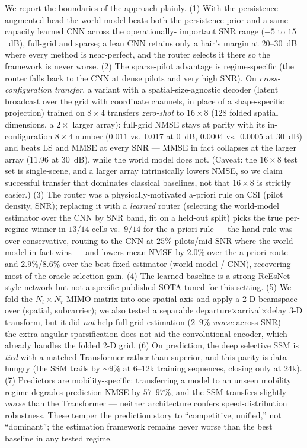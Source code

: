 \documentclass[11pt]{article}
\begin{document}
We report the boundaries of the approach plainly. (1) With the persistence-augmented head the world
model beats both the persistence prior and a same-capacity learned CNN across the operationally-
important SNR range ($-5$ to $15$~dB), full-grid and sparse; a lean CNN retains only a hair's margin
at $20$--$30$~dB where every method is near-perfect, and the router selects it there so the framework
is never worse. (2) The sparse-pilot advantage is regime-specific (the router falls back to the CNN at
dense pilots and very high SNR). On \emph{cross-configuration transfer}, a variant with a
spatial-size-agnostic decoder (latent broadcast over the grid with coordinate channels, in place of a
shape-specific projection) trained on $8\times4$ transfers \emph{zero-shot} to $16\times8$ ($128$ folded
spatial dimensions, a $2\times$ larger array): full-grid NMSE stays at parity with its in-configuration
$8\times4$ number ($0.011$ vs.\ $0.017$ at $0$~dB, $0.0004$ vs.\ $0.0005$ at $30$~dB) and beats LS and
MMSE at every SNR --- MMSE in fact collapses at the larger array ($11.96$ at $30$~dB), while the world
model does not. (Caveat: the $16\times8$ test set is single-scene, and a larger array intrinsically
lowers NMSE, so we claim successful transfer that dominates classical baselines, not that $16\times8$ is
strictly easier.) (3) The router was a physically-motivated a-priori rule on CSI (pilot density, SNR); replacing it with
a \emph{learned} router (selecting the world-model estimator over the CNN by SNR band, fit on a
held-out split) picks the true per-regime winner in $13/14$ cells vs.\ $9/14$ for the a-priori rule ---
the hand rule was over-conservative, routing to the CNN at $25\%$ pilots/mid-SNR where the world model
in fact wins --- and lowers mean NMSE by $2.0\%$ over the a-priori route and $2.9\%$/$8.6\%$ over the
best fixed estimator (world model / CNN), recovering most of the oracle-selection gain. (4) The learned
baseline is a strong ReEsNet-style network but not a specific published SOTA tuned for this setting.
(5) We fold the $N_t\times N_r$ MIMO matrix into one spatial axis and apply a 2-D beamspace over
(spatial, subcarrier); we also tested a separable departure$\times$arrival$\times$delay 3-D transform,
but it did \emph{not} help full-grid estimation ($2$--$9\%$ \emph{worse} across SNR) --- the extra
angular sparsification does not aid the convolutional encoder, which already handles the folded 2-D
grid. (6) On prediction, the deep selective
SSM is \emph{tied} with a matched Transformer rather than superior, and this parity is data-hungry (the
SSM trails by ${\sim}9\%$ at $6$--$12$k training sequences, closing only at $24$k). (7) Predictors are
mobility-specific: transferring a model to an unseen mobility regime degrades prediction NMSE by
$57$--$97\%$, and the SSM transfers slightly \emph{worse} than the Transformer --- neither architecture
confers speed-distribution robustness. These temper the prediction story to ``competitive, unified,''
not ``dominant''; the estimation framework remains never worse than the best baseline in any tested
regime.
\end{document}
